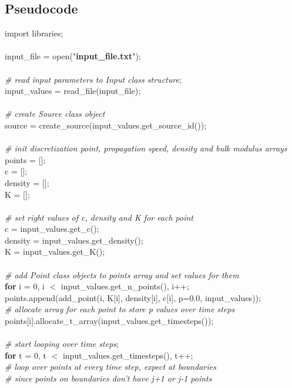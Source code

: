 \documentclass[]{article}
\begin{document}
\subsection{Pseudocode}
import libraries; \\
\\
input\_file = open("\textbf{input\_file.txt}"); \\
\\
\textit{\# read input parameters to Input class structure}; \\
input\_values = read\_file(input\_file); \\
\\
\textit{\# create Source class object} \\
source = create\_source(input\_values.get\_source\_id()); \\
\\
\textit{\# init discretization point, propagation speed, density and bulk modulus arrays} \\
points = []; \\
c = []; \\
density = []; \\
K = []; \\
\\
\textit{\# set right values of c, density and K for each point} \\
c = input\_values.get\_c(); \\
density = input\_values.get\_density(); \\
K = input\_values.get\_K(); \\
\\
\textit{\# add Point class objects to points array and set values for them} \\
\textbf{for} i = 0, i $<$ input\_values.get\_n\_points(), i++; \\
\indent points.append(add\_point(i, K[i], density[i], c[i], p=0.0, input\_values)); \\
\indent \textit{\# allocate array for each point to store p values over time steps} \\
\indent points[i].allocate\_t\_array(input\_values.get\_timesteps()); \\
\\
\textit{\# start looping over time steps}; \\
\textbf{for} t = 0, t $<$ input\_values.get\_timesteps(), t++; \\
\indent \textit{\# loop over points at every time step, expect at boundaries} \\
\indent \textit{\# since points on boundaries don't have j+1 or j-1 points} \\
\end{document}
